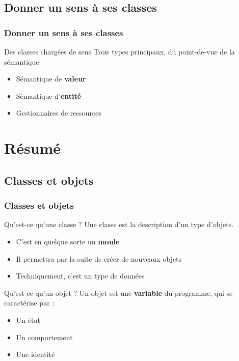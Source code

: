 \documentclass{beamer}
\begin{document}
\subsection{Donner un sens à ses classes}

\begin{frame}
\frametitle{Donner un sens à ses classes}
\begin{block}{Des classes chargées de sens}
Trois types principaux, du point-de-vue de la sémantique
\begin{itemize}
\item{Sémantique de \textbf{valeur}}
\item{Sémantique d'\textbf{entité}}
\item{Gestionnaires de ressources}
\end{itemize}
\end{block}
\end{frame}


\section{Résumé}
\subsection{Classes et objets}

\begin{frame}
\frametitle{Classes et objets}
\begin{block}{Qu'est-ce qu'une classe ?}
Une classe est la description d'un type d'objets.
\begin{itemize}
\item{C'est en quelque sorte un \textbf{moule}}
\item{Il permettra par la suite de créer de nouveaux objets}
\item{Techniquement, c'est un type de données}
\end{itemize}
\end{block}
\begin{block}{Qu'est-ce qu'un objet ?}
Un objet est une \textbf{variable} du programme, qui se caractérise par :
\begin{itemize}
\item{Un état}
\item{Un comportement}
\item{Une identité}
\end{itemize}
\end{block}
\end{frame}
\end{document}
